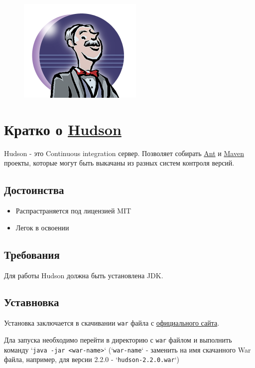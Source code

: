 \documentclass[a4paper,12pt]{article}
\begin{document}
\thispagestyle{empty}

\begin{figure}[h]
	\centering
	\includegraphics[scale=0.60]{hudson-logo.png}
\end{figure}
\clearpage

\tableofcontents 
\clearpage

\section{Кратко о \href{http://hudson-ci.org/}{Hudson}}

Hudson - это Continuous integration сервер. Позволяет собирать
\href{}{Ant} и \href{}{Maven} проекты, которые могут быть выкачаны из разных
систем контроля версий. 

\subsection{Достоинства}
\begin{itemize}
  \item Распрастраняется под лицензией MIT
  \item Легок в освоении
\end{itemize}

\subsection{Требования}
Для работы Hudson должна быть установлена JDK.

\subsection{Уставновка}
Установка заключается в скачивании \texttt{war} файла с \href{http://hudson-ci.org/}{официального сайта}.

Дла запуска необходимо перейти в директорию с \texttt{war} файлом и выполнить команду 
`\texttt{java -jar <war-name>}` (`\texttt{war-name}` - заменить на имя скачанного War файла, 
например, для версии 2.2.0 - `\texttt{hudson-2.2.0.war}`)
\end{document}
